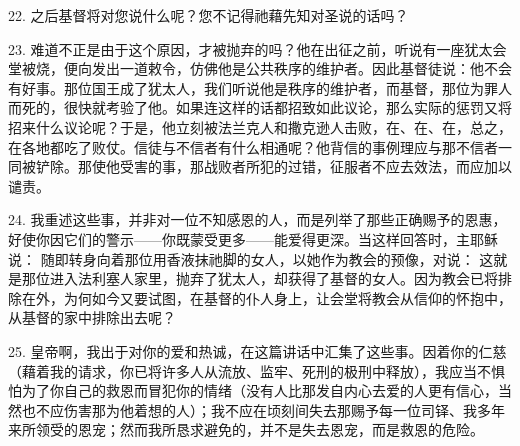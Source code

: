 22. 之后基督将对您说什么呢？您不记得祂藉先知对圣说的话吗？\par

23. 难道不正是由于这个原因，才被抛弃的吗？他在出征之前，听说有一座犹太会堂被烧，便向发出一道敕令，仿佛他是公共秩序的维护者。因此基督徒说：他不会有好事。那位国王成了犹太人，我们听说他是秩序的维护者，而基督，那位为罪人而死的，很快就考验了他。如果连这样的话都招致如此议论，那么实际的惩罚又将招来什么议论呢？于是，他立刻被法兰克人和撒克逊人击败，在、在、在，总之，在各地都吃了败仗。信徒与不信者有什么相通呢？他背信的事例理应与那不信者一同被铲除。那使他受害的事，那战败者所犯的过错，征服者不应去效法，而应加以谴责。\par

24. 我重述这些事，并非对一位不知感恩的人，而是列举了那些正确赐予的恩惠，好使你因它们的警示——你既蒙受更多——能爱得更深。当这样回答时，主耶稣说： 随即转身向着那位用香液抹祂脚的女人，以她作为教会的预像，对说： 这就是那位进入法利塞人家里，抛弃了犹太人，却获得了基督的女人。因为教会已将排除在外，为何如今又要试图，在基督的仆人身上，让会堂将教会从信仰的怀抱中，从基督的家中排除出去呢？\par

25. 皇帝啊，我出于对你的爱和热诚，在这篇讲话中汇集了这些事。因着你的仁慈（藉着我的请求，你已将许多人从流放、监牢、死刑的极刑中释放），我应当不惧怕为了你自己的救恩而冒犯你的情绪（没有人比那发自内心去爱的人更有信心，当然也不应伤害那为他着想的人）；我不应在顷刻间失去那赐予每一位司铎、我多年来所领受的恩宠；然而我所恳求避免的，并不是失去恩宠，而是救恩的危险。\par

